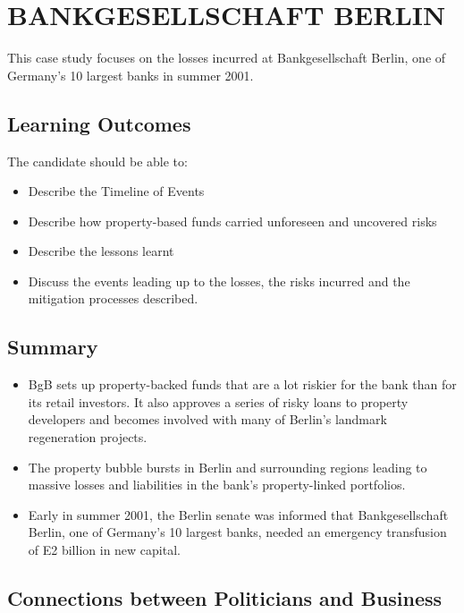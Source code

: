 \documentclass[PRMIA4A.tex]{subfiles}
\begin{document}
 
	
	\newpage

\newpage
\section{BANKGESELLSCHAFT BERLIN}

This case study focuses on the losses incurred at Bankgesellschaft Berlin, one of Germany’s 10 largest banks in summer 2001.

\subsection{Learning Outcomes}
The candidate should be able to:
\begin{itemize}
	\item Describe the Timeline of Events
	\item Describe how property-based funds carried unforeseen and uncovered risks
	\item Describe the lessons learnt
	\item Discuss the events leading up to the losses, the risks incurred and the mitigation processes described.
\end{itemize}


\subsection{Summary}
\begin{itemize}
	\item BgB sets up property-backed funds that are a lot riskier for the bank than for its retail investors. It also
	approves a series of risky loans to property developers and becomes involved with many of Berlin’s landmark
	regeneration projects.
	\item The property bubble bursts in Berlin and surrounding regions leading to massive losses and liabilities in the
	bank’s property-linked portfolios.
	\item Early in summer 2001, the Berlin senate was informed that Bankgesellschaft Berlin, one of Germany’s 10 largest
	banks, needed an emergency transfusion of E2 billion in new capital.
\end{itemize}






\subsection*{Connections between Politicians and Business}
\end{document}
